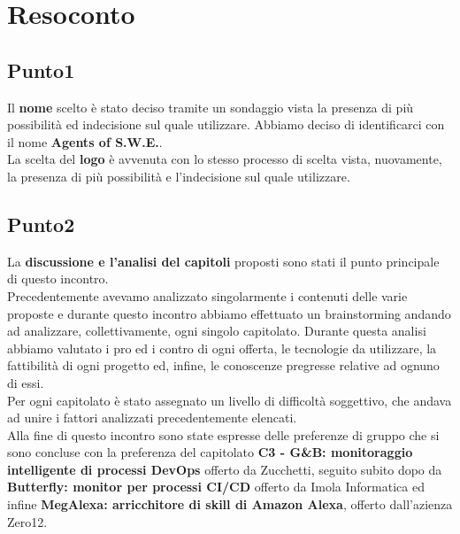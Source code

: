 \section{Resoconto}

\subsection{Punto1}
Il \textbf{nome} scelto è stato deciso tramite un sondaggio vista la presenza di più possibilità ed indecisione sul quale utilizzare. Abbiamo deciso di identificarci con il nome \textbf{Agents of S.W.E.}.\\
La scelta del \textbf{logo} è avvenuta con lo stesso processo di scelta vista, nuovamente, la presenza di più possibilità e l'indecisione sul quale utilizzare.

\subsection{Punto2}
La \textbf{discussione e l'analisi del capitoli} proposti sono stati il punto principale di questo incontro. \\
Precedentemente avevamo analizzato singolarmente i contenuti delle varie proposte e durante questo incontro abbiamo effettuato un brainstorming andando ad analizzare, collettivamente, ogni singolo capitolato. Durante questa analisi abbiamo valutato i pro ed i contro di ogni offerta, le tecnologie da utilizzare, la fattibilità di ogni progetto ed, infine, le conoscenze pregresse relative ad ognuno di essi. \\
Per ogni capitolato è stato assegnato un livello di difficoltà soggettivo, che andava ad unire i fattori analizzati precedentemente elencati.\\
Alla fine di questo incontro sono state espresse delle preferenze di gruppo che si sono concluse con la preferenza del capitolato \textbf{C3 - G\&B: monitoraggio intelligente di processi DevOps} offerto da Zucchetti, seguito subito dopo da \textbf{Butterfly: monitor per processi CI/CD} offerto da Imola Informatica ed infine \textbf{MegAlexa: arricchitore di skill di Amazon Alexa}, offerto dall'azienza Zero12.\\
